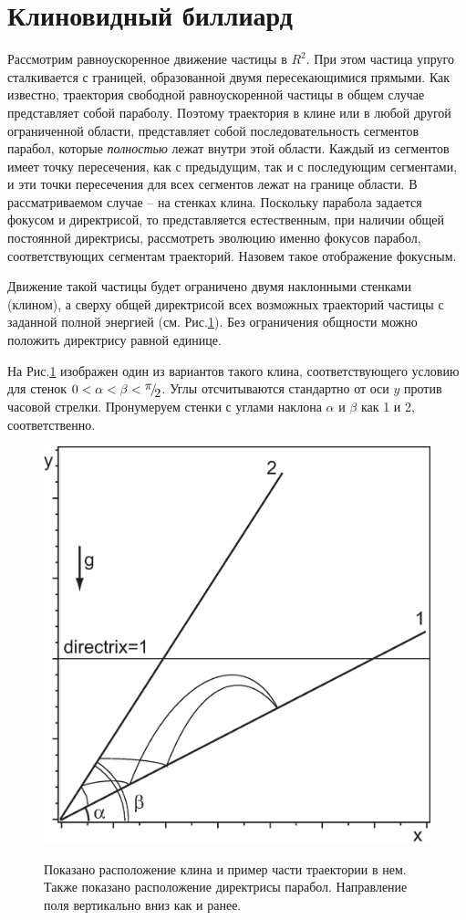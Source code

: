 \documentclass[a4paper]{article}
\begin{document}
\section{ Клиновидный биллиард }

Рассмотрим равноускоренное движение частицы в $R^{2} $. При этом частица упруго сталкивается с границей, образованной двумя пересекающимися прямыми.
Как известно, траектория свободной равноускоренной частицы в общем случае представляет собой параболу. Поэтому траектория в клине или в любой другой ограниченной области, представляет собой последовательность сегментов парабол, которые \textit{полностью} лежат внутри этой области. Каждый из сегментов имеет точку пересечения, как с предыдущим, так и с последующим сегментами, и эти точки пересечения для всех сегментов лежат на границе области. В рассматриваемом случае -- на стенках клина. Поскольку парабола задается фокусом и директрисой, то представляется естественным, при наличии общей постоянной директрисы, рассмотреть эволюцию именно фокусов парабол, соответствующих сегментам траекторий. Назовем такое отображение фокусным.

Движение такой частицы будет ограничено двумя наклонными стенками (клином), а сверху общей директрисой всех возможных траекторий частицы с заданной полной энергией (см. Рис.\ref{image4}). Без ограничения общности можно положить директрису равной единице.

На Рис.\ref{image4} изображен один из вариантов такого клина, соответствующего условию для стенок $0<\alpha <\beta <{\raise0.7ex\hbox{$ \pi  $}\!\mathord{\left/ {\vphantom {\pi  2}} \right. \kern-\nulldelimiterspace}\!\lower0.7ex\hbox{$ 2 $}} $. Углы отсчитываются стандартно от оси $y$ против часовой стрелки. Пронумеруем стенки с углами наклона $\alpha $ и $\beta $ как 1 и 2, соответственно.
\begin{figure}[ht]
  \centering
 \includegraphics[width=6 cm]{in3n.eps}\\
  \caption{Показано расположение клина и пример части траектории в нем. Также показано расположение директрисы парабол. Направление поля вертикально вниз как и ранее.}\label{image4}
\end{figure}
\end{document}
